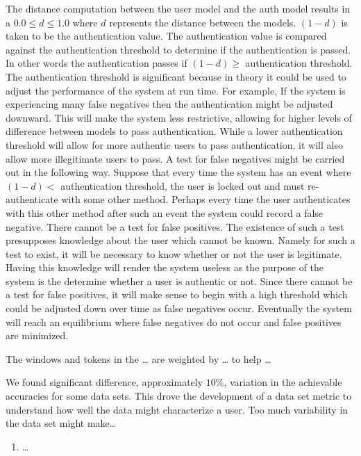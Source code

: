 The distance computation between the 
user model and the auth model
results in a $0.0 \leq d \leq 1.0$ where
$d$ represents the distance between the models.
%
$(1 - d)$ is taken to be the authentication value.
The authentication value is compared against the
authentication threshold to determine if the authentication is passed.
% 
In other words the authentication passes if
$(1 - d) \geq$ authentication threshold.
%
The authentication threshold is significant
because in theory it could be used to adjust the 
performance of the system at run time.
%
For example,
If the system is experiencing many false negatives
then the authentication might be adjusted downward.
This will make the system less restrictive,
allowing for higher levels of difference between models to pass authentication.
%
While a lower authentication threshold will allow for more authentic users
to pass authentication, it will also allow more illegitimate users to pass.
%
A test for false negatives might be carried out in the following way.
Suppose that every time the system has an event where $(1 - d) <$ authentication threshold,
the user is locked out and must re-authenticate with some other method.
Perhaps every time the user authenticates with this other method after
such an event the system could record a false negative.
%
There cannot be a test for false positives.
The existence of such a test presupposes 
knowledge about the user which cannot be known.
Namely for such a test to exist,
it will be necessary to know whether or not
the user is legitimate.
Having this knowledge will render the system useless
as the purpose of the system is the determine whether a user is authentic or not.
%
Since there cannot be a test for false positives,
it will make sense to begin with a high threshold which
could be adjusted down over time as false negatives occur.
%
Eventually the system will reach an equilibrium where
false negatives do not occur and 
false positives are minimized.

%
The windows and tokens in the \dots 
are weighted by \dots
to help \dots

We found significant difference, approximately $10\%$, 
variation in the achievable accuracies for some data sets.
This drove the development of a data set metric to
understand how well the data might characterize a user.
%
Too much variability in the data set might make\dots
%
\begin{enumerate}
\item \dots
\end{enumerate}

